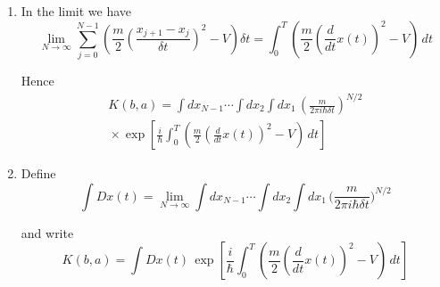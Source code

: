 \documentclass[12pt]{article}
\begin{document}
\begin{enumerate}
\item
In the limit we have
\begin{equation*}
\lim_{N\rightarrow\infty}
\sum_{j=0}^{N-1}
\left(
\frac{m}{2}\left(\frac{x_{j+1}-x_j}{\delta t}\right)^2-V
\right)\delta t
=
\int_0^T
\left(
\frac{m}{2}\left(\frac{d}{dt}x(t)\right)^2-V
\right)\,dt
\end{equation*}

Hence
\begin{multline*}
K(b,a)=\int dx_{N-1}\cdots\int dx_2\int dx_1\,
\left(\frac{m}{2\pi i\hbar\delta t}\right)^{N/2}
\\
{}\times
\exp\left[
\frac{i}{\hbar}
\int_0^T
\left(
\frac{m}{2}\left(\frac{d}{dt}x(t)\right)^2-V
\right)
\,dt
\right]
\end{multline*}

\item
Define
\begin{equation*}
\int Dx(t)=\lim_{N\rightarrow\infty}
\int dx_{N-1}\cdots\int dx_2\int dx_1\,
\biggl(\frac{m}{2\pi i\hbar\delta t}\biggr)^{N/2}
\end{equation*}

and write
\begin{equation*}
K(b,a)=\int Dx(t)\,
\exp\left[
\frac{i}{\hbar}
\int_0^T
\left(
\frac{m}{2}\left(\frac{d}{dt}x(t)\right)^2-V
\right)
\,dt
\right]
\end{equation*}

\end{enumerate}
\end{document}
